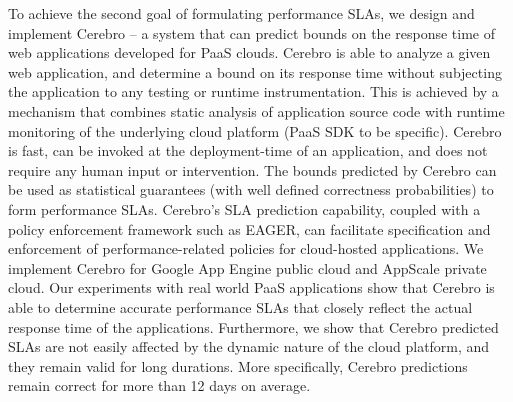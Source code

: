 To achieve the second goal of formulating performance SLAs, we design and implement Cerebro --
a system that can predict bounds on the response time of web applications developed for PaaS clouds.
Cerebro is able to analyze a given web application, and determine a bound on its response time without
subjecting the application to any testing or runtime instrumentation. This is achieved by a mechanism
that combines static analysis of application source code with runtime monitoring of the underlying
cloud platform (PaaS SDK to be specific). Cerebro is fast, can be invoked at the deployment-time 
of an application, and does not require any human input or intervention. 
The bounds predicted by Cerebro can be used as statistical guarantees (with well defined correctness
probabilities) to form performance SLAs. Cerebro's SLA prediction capability, coupled with a policy
enforcement framework such as EAGER, can facilitate specification and enforcement of performance-related
policies for cloud-hosted applications. We implement Cerebro for Google App Engine public cloud
and AppScale private cloud. Our experiments with real world PaaS applications show that Cerebro
is able to determine accurate performance SLAs that closely reflect the actual response time
of the applications. Furthermore, we show that Cerebro predicted SLAs are not easily affected by
the dynamic nature of the cloud platform, and they remain valid for long durations. More specifically, 
Cerebro predictions remain correct for more than 12 days on average. 
